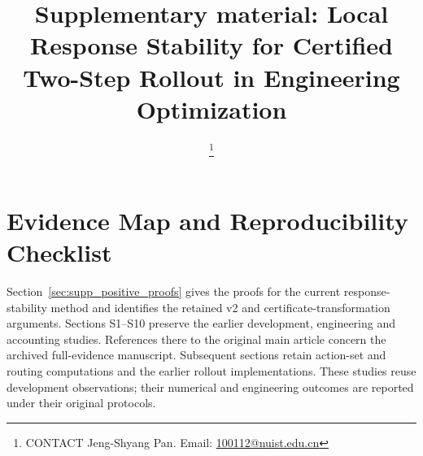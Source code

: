 \documentclass[suppldata]{interact}
\begin{document}
\title{Supplementary material: Local Response Stability for Certified Two-Step Rollout in Engineering Optimization}
\author{
\thanks{CONTACT Jeng-Shyang Pan. Email: \href{mailto:100112@nuist.edu.cn}{100112@nuist.edu.cn}}
}
\maketitle
\renewcommand\thesection{A\arabic{section}}
\renewcommand\theHsection{A\arabic{section}}
\setcounter{section}{0}


\setcounter{section}{-1}\renewcommand\thesection{S\arabic{section}}\renewcommand\theHsection{S\arabic{section}}\renewcommand\thetable{S\arabic{table}}\renewcommand\thefigure{S\arabic{figure}}

\hypertarget{evidence-map-and-reproducibility-checklist}{%
\section{Evidence Map and Reproducibility Checklist}\label{evidence-map-and-reproducibility-checklist}}

Section~\ref{sec:supp_positive_proofs} gives the proofs for the current response-stability method and identifies the retained v2 and certificate-transformation arguments. Sections S1--S10 preserve the earlier development, engineering and accounting studies. References there to the original main article concern the archived full-evidence manuscript. Subsequent sections retain action-set and routing computations and the earlier rollout implementations. These studies reuse development observations; their numerical and engineering outcomes are reported under their original protocols.
\end{document}
